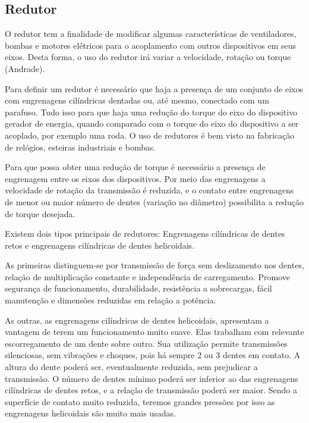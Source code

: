 \subsection{Redutor}

O redutor tem a finalidade de modificar algumas características de ventiladores, bombas e motores elétricos para o acoplamento com outros dispositivos em seus eixos. Desta forma, o uso do redutor irá variar a velocidade, rotação ou torque (Andrade).

Para definir um redutor é necessário que haja a presença de um conjunto de eixos com engrenagens cilíndricas dentadas ou, até mesmo, conectado com um parafuso. Tudo isso para que haja uma redução do torque do eixo do dispositivo gerador de energia, quando comparado com o torque do eixo do dispositivo a ser acoplado, por exemplo uma roda. O uso de redutores é bem visto na fabricação de relógios, esteiras industriais e bombas.

Para que possa obter uma redução de torque é necessário a presença de engrenagem entre os eixos dos dispositivos. Por meio das engrenagens a velocidade de rotação da transmissão é reduzida, e o contato entre engrenagens de menor ou maior número de dentes (variação no diâmetro) possibilita a redução de torque desejada.

Existem dois tipos principais de redutores: Engrenagens cilíndricas de dentes retos e engrenagens cilíndricas de dentes helicoidais.

As primeiras distinguem-se por transmissão de força sem deslizamento nos dentes, relação de multiplicação constante e independência de carregamento. Promove segurança de funcionamento, durabilidade, resistência a sobrecargas, fácil manutenção e dimensões reduzidas em relação a potência.

As outras, as engrenagens cilíndricas de dentes helicoidais, apresentam a vantagem de terem um funcionamento muito suave. Elas trabalham com relevante escorregamento de um dente sobre outro. Sua utilização permite transmissões silenciosas, sem vibrações e choques, pois há sempre 2 ou 3 dentes em contato. A altura do dente poderá ser, eventualmente reduzida, sem prejudicar a transmissão. O número de dentes mínimo poderá ser inferior ao das engrenagens cilíndricas de dentes retos, e a relação de transmissão poderá ser maior. Sendo a superfície de contato muito reduzida, teremos grandes pressões por isso as engrenagens helicoidais são muito mais usadas.

